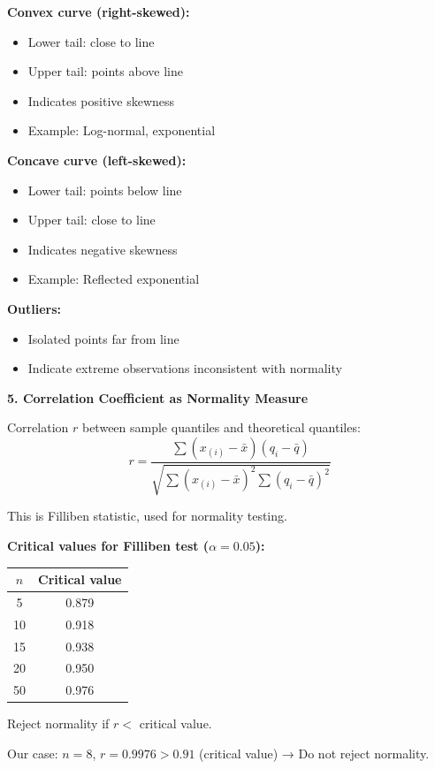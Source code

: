 \documentclass[12pt]{article}
\begin{document}
\begin{explanation}
\textbf{Convex curve (right-skewed):}
\begin{itemize}
\item Lower tail: close to line
\item Upper tail: points above line
\item Indicates positive skewness
\item Example: Log-normal, exponential
\end{itemize}

\textbf{Concave curve (left-skewed):}
\begin{itemize}
\item Lower tail: points below line
\item Upper tail: close to line
\item Indicates negative skewness
\item Example: Reflected exponential
\end{itemize}

\textbf{Outliers:}
\begin{itemize}
\item Isolated points far from line
\item Indicate extreme observations inconsistent with normality
\end{itemize}

\textbf{5. Correlation Coefficient as Normality Measure}

Correlation $r$ between sample quantiles and theoretical quantiles:
\[r = \frac{\sum (x_{(i)} - \bar{x})(q_i - \bar{q})}{\sqrt{\sum (x_{(i)} - \bar{x})^2 \sum (q_i - \bar{q})^2}}\]

This is Filliben statistic, used for normality testing.

\textbf{Critical values for Filliben test ($\alpha = 0.05$):}

\begin{center}
\begin{tabular}{cc}
$n$ & Critical value \\
\hline
5 & 0.879 \\
10 & 0.918 \\
15 & 0.938 \\
20 & 0.950 \\
50 & 0.976 \\
\end{tabular}
\end{center}

Reject normality if $r <$ critical value.

Our case: $n=8$, $r = 0.9976 > 0.91$ (critical value) → Do not reject normality.


\end{explanation}
\end{document}
